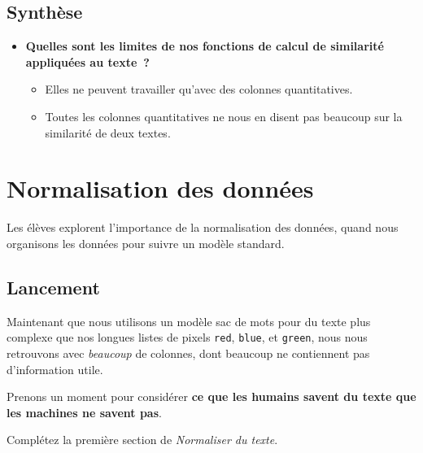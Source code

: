 \documentclass[12pt,a4paper]{article}
\begin{document}
\subsection{Synthèse}

\begin{thinkbox}
  \begin{itemize}
    \item \textbf{Quelles sont les limites de nos fonctions de calcul de similarité appliquées au texte~?}
    \begin{itemize}
      \item Elles ne peuvent travailler qu'avec des colonnes quantitatives.
      \item Toutes les colonnes quantitatives ne nous en disent pas beaucoup sur la similarité de deux textes.
    \end{itemize}
  \end{itemize}
\end{thinkbox}

\newpage

\section{Normalisation des données}

\begin{overviewbox}
  Les élèves explorent l'importance de la normalisation des données, quand nous organisons les données pour suivre un modèle standard.
\end{overviewbox}

\subsection{Lancement}

Maintenant que nous utilisons un modèle sac de mots pour du texte plus complexe que nos longues listes de pixels \texttt{red}, \texttt{blue}, et \texttt{green}, nous nous retrouvons avec \emph{beaucoup} de colonnes, dont beaucoup ne contiennent pas d'information utile.

\begin{activitybox}
  Prenons un moment pour considérer \textbf{ce que les humains savent du texte que les machines ne savent pas}.

  Complétez la première section de \emph{Normaliser du texte}.
\end{activitybox}
\end{document}
